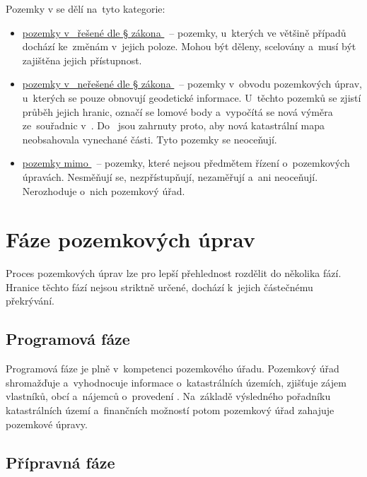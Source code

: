 Pozemky v  se dělí na~tyto kategorie:
\vspace{-\topsep}
	\begin{itemize}[leftmargin=1.5cm, noitemsep]
        \item \underline{pozemky v~ řešené dle § zákona
          \citep{pu_zakon}}~– pozemky, u~kterých ve většině případů
          dochází ke~změnám v~jejich poloze. Mohou být děleny,
          scelovány a~musí být zajištěna jejich přístupnost.
        \item \underline{pozemky v~ neřešené dle § zákona
          \citep{pu_zakon}}~– pozemky v~obvodu pozem\-kových úprav,
          u~kterých se pouze obnovují geodetické informace.
          U~těchto pozemků se zjistí průběh jejich hranic, označí
          se lomové body a~vypočítá se nová výměra ze~souřadnic
          v~. Do~ jsou zahrnuty proto, aby nová
          katastrální mapa neobsahovala vynechané části. Tyto
          pozemky se neoceňují.
        \item \underline{pozemky mimo }~– pozemky, které
          nejsou předmětem řízení o~pozem\-kových úpravách. Nesměňují
          se, nezpřístupňují, nezaměřují a~ani neoceňují. Nerozhoduje
          o~nich pozemkový úřad.
	\end{itemize}

\section{Fáze pozemkových úprav}
\label{etapy_pu}

Proces pozemkových úprav lze pro lepší přehlednost rozdělit
do několika fází. Hra\-nice těchto fází nejsou striktně určené, dochází
k~jejich částečnému překrývání.

\subsection{Programová fáze}
\label{programova_faze}

Programová fáze je plně v~kompetenci pozemkového úřadu. Pozemkový úřad
shromažďuje a~vyhodnocuje informace o~katastrálních územích, zjišťuje
zájem vlastníků, obcí a~nájemců o~provedení . Na~základě
výsledného pořadníku katastrálních území a~finančních možností potom
pozemkový úřad zahajuje pozemkové úpravy.

\subsection{Přípravná fáze}
\label{pripravna_faze}

